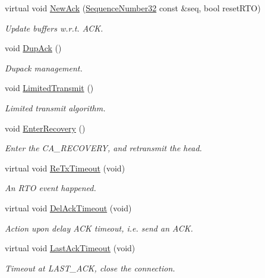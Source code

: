 \begin{DoxyCompactItemize}
virtual void \hyperlink{classns3_1_1TcpSocketBase_a13401dd51854607d0521a35bf2622761}{New\+Ack} (\hyperlink{group__network_gacb2070e4e98d2d5135c9bede58f07a03}{Sequence\+Number32} const \&seq, bool reset\+R\+TO)
\begin{DoxyCompactList}\small\item\em Update buffers w.\+r.\+t. A\+CK. \end{DoxyCompactList}\item 
void \hyperlink{classns3_1_1TcpSocketBase_a9139f54e2cdf0f1a796011a43dabfad5}{Dup\+Ack} ()
\begin{DoxyCompactList}\small\item\em Dupack management. \end{DoxyCompactList}\item 
void \hyperlink{classns3_1_1TcpSocketBase_ae192934b14961166fa6cd3197c85406c}{Limited\+Transmit} ()
\begin{DoxyCompactList}\small\item\em Limited transmit algorithm. \end{DoxyCompactList}\item 
void \hyperlink{classns3_1_1TcpSocketBase_aad6550badbb76f8b04811f14e7afd10c}{Enter\+Recovery} ()
\begin{DoxyCompactList}\small\item\em Enter the C\+A\+\_\+\+R\+E\+C\+O\+V\+E\+RY, and retransmit the head. \end{DoxyCompactList}\item 
virtual void \hyperlink{classns3_1_1TcpSocketBase_a60bb6a7cfb5855bba206606174d50c5e}{Re\+Tx\+Timeout} (void)
\begin{DoxyCompactList}\small\item\em An R\+TO event happened. \end{DoxyCompactList}\item 
virtual void \hyperlink{classns3_1_1TcpSocketBase_a6bea4790f749e771462d8e4ab63ebc67}{Del\+Ack\+Timeout} (void)
\begin{DoxyCompactList}\small\item\em Action upon delay A\+CK timeout, i.\+e. send an A\+CK. \end{DoxyCompactList}\item 
virtual void \hyperlink{classns3_1_1TcpSocketBase_affa65b010fdc8c5f32105f5c8279f50d}{Last\+Ack\+Timeout} (void)
\begin{DoxyCompactList}\small\item\em Timeout at L\+A\+S\+T\+\_\+\+A\+CK, close the connection. \end{DoxyCompactList}\item 

\end{DoxyCompactItemize}
